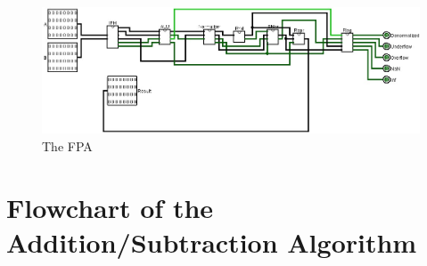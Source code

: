 \documentclass[a4paper,12pt]{article}
\begin{document}
\begin{figure}[H]
    \centering
    \includegraphics[width=1\textwidth]{FPA.jpg}
    \caption{The FPA}
    \label{FPA}
\end{figure}

\section{Flowchart of the Addition/Subtraction Algorithm}
\end{document}
